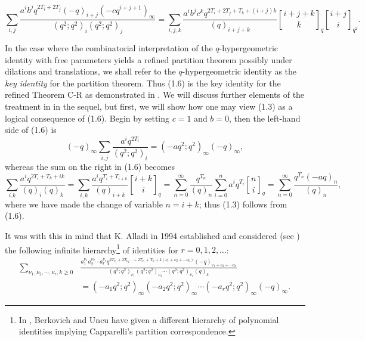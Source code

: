 \documentclass[12pt,a4paper]{amsart}
\theoremstyle{definition}
\theoremstyle{notation}
\theoremstyle{corollary}
\begin{document}
\[
\sum_{i,j}\frac{a^ib^jq^{2T_i+2T_j}(-q)_{i+j}(-cq^{i+j+1})_{\infty}}{(q^2;q^2)_i(q^2;q^2)_j}=\sum_{i,j,k}\frac{a^ib^jc^kq^{2T_i+2T_j+T_k+(i+j)k}}{(q)_{i+j+k}}{{i+j+k} \brack k}_q
{{i+j} \brack i}_{q^2}.\tag{1.6}
\]

In the case where the combinatorial interpretation of the $q$-hypergeometric identity with free parameters yields a refined partition theorem possibly under dilations and translations, we shall refer to the $q$-hypergeometric identity as the \textit{key identity} for the partition theorem. Thus (1.6) is the key identity
for the refined Theorem C-R as demonstrated in \cite{KAGEABG95}. We will discuss further elements of the treatment in \cite{KAGEABG95} in the sequel, but first, we will show how one may view (1.3) as a logical consequence of (1.6). Begin by setting $c=1$ and $b=0$, then the left-hand side of (1.6) is 
\[
(-q)_{\infty}\sum_{i,j}\frac{a^iq^{2T_i}}{(q^2;q^2)_i}
=(-aq^2;q^2)_{\infty}(-q)_{\infty},
\]
whereas the sum on the right in (1.6) becomes
\[
\sum_{i.k}\frac{a^iq^{2T_i+T_k+ik}}{(q)_i(q)_k}
=\sum_{i,k}\frac{a^iq^{T_i+T_{i+k}}}{(q)_{i+k}}{{i+k}\brack i}_q
=\sum^{\infty}_{n=0}\frac{q^{T_n}}{(q)_n}\sum^n_{i=0}a^iq^{T_i}{n\brack i}_q
=\sum^{\infty}_{n=0}\frac{q^{T_n}(-aq)_n}{(q)_n},
\]
where we have made the change of variable $n=i+k$; thus (1.3) follows from (1.6).

It was with this in mind that K. Alladi in 1994 established and considered (see \cite{YAKA25}) the following infinite hierarchy\footnote{In \cite{ABAKU20,ABAKU22}, Berkovich and Uncu have given a different hierarchy of polynomial identities implying Capparelli's partition correspondence.} of identities for $r=0,1,2,\dots$:
\begin{align*}
\sum_{\nu_1, \nu_2, \cdots, \nu_r, k\ge 0}&\frac{a^{\nu_1}_1a^{\nu_2}_2\cdots a^{\nu_r}_rq^{2T_{\nu_1}+2T_{\nu_2}\cdots +2T_{\nu_r}+T_k+k(\nu_1+\nu_2+\cdots \nu_k)}(-q)_{\nu_1+\nu_2+\cdots\nu_k}}{(q^2;q^2)_{\nu_1}(q^2;q^2)_{\nu_2}\cdots (q^2;q^2)_{\nu_r}(q)_k}\\
&=(-a_1q^2;q^2)_{\infty}(-a_2q^2;q^2)_{\infty}\cdots(-a_rq^2;q^2)_{\infty}(-q)_\infty\tag{1.7}.    
\end{align*}
\end{document}
